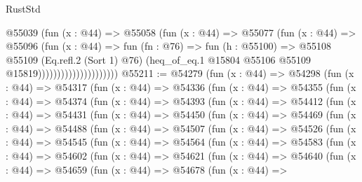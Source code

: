 \begin{lexlean}{RustStd}
\begin{coremodule}
                                  @55039
                                    (fun (x : @44) =>
                                    @55058
                                      (fun (x : @44) =>
                                      @55077
                                        (fun (x : @44) =>
                                        @55096
                                          (fun (x : @44) =>
                                          fun (fn : @76) =>
                                          fun (h : @55100) =>
                                          @55108
                                            @55109
                                            (Eq.refl.{2} (Sort 1) @76)
                                            (heq_of_eq.{1}
                                              @15804
                                              @55106
                                              @55109
                                              @15819)))))))))))))))))))))
@55211 := @54279
    (fun (x : @44) =>
    @54298
      (fun (x : @44) =>
      @54317
        (fun (x : @44) =>
        @54336
          (fun (x : @44) =>
          @54355
            (fun (x : @44) =>
            @54374
              (fun (x : @44) =>
              @54393
                (fun (x : @44) =>
                @54412
                  (fun (x : @44) =>
                  @54431
                    (fun (x : @44) =>
                    @54450
                      (fun (x : @44) =>
                      @54469
                        (fun (x : @44) =>
                        @54488
                          (fun (x : @44) =>
                          @54507
                            (fun (x : @44) =>
                            @54526
                              (fun (x : @44) =>
                              @54545
                                (fun (x : @44) =>
                                @54564
                                  (fun (x : @44) =>
                                  @54583
                                    (fun (x : @44) =>
                                    @54602
                                      (fun (x : @44) =>
                                      @54621
                                        (fun (x : @44) =>
                                        @54640
                                          (fun (x : @44) =>
                                          @54659
                                            (fun (x : @44) =>
                                            @54678
                                              (fun (x : @44) =>

\end{coremodule}
\end{lexlean}
